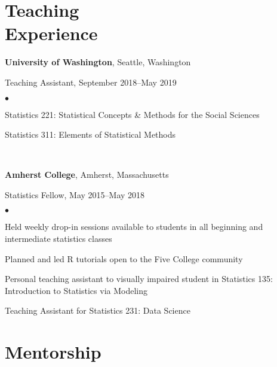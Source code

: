 \documentclass[margin,centered]{res}
\newenvironment{list1}{
  \begin{list}{\ding{113}}{%
      \setlength{\itemsep}{0in}
      \setlength{\parsep}{0in} \setlength{\parskip}{0in}
      \setlength{\topsep}{0in} \setlength{\partopsep}{0in}
      \setlength{\leftmargin}{0.17in}}}{\end{list}}
\newenvironment{list2}{
  \begin{list}{$\bullet$}{%
      \setlength{\itemsep}{0in}
      \setlength{\parsep}{0in} \setlength{\parskip}{0in}
      \setlength{\topsep}{0in} \setlength{\partopsep}{0in}
      \setlength{\leftmargin}{0.2in}}}{\end{list}}
\begin{document}
\begin{resume}
\section{\sc Teaching \\ Experience}

{\bf University of Washington}, Seattle, Washington
\begin{list1}
\item[] Teaching Assistant, September 2018--May 2019
\begin{list2}
\vspace*{.05in}
\item Statistics 221: Statistical Concepts \& Methods for the Social Sciences
\item Statistics 311: Elements of Statistical Methods
\end{list2}
\end{list1}

\

{\bf Amherst College}, Amherst, Massachusetts
\begin{list1}
\item[] Statistics Fellow, May 2015--May 2018
\begin{list2}
\vspace*{.05in}
\item Held weekly drop-in sessions available to students in all beginning and intermediate statistics classes
\item Planned and led R tutorials open to the Five College community
\item Personal teaching assistant to visually impaired student in Statistics 135: Introduction to Statistics via Modeling
\item Teaching Assistant for Statistics 231: Data Science
\end{list2}
\end{list1}


\section{\sc Mentorship}


\end{resume}
\end{document}
